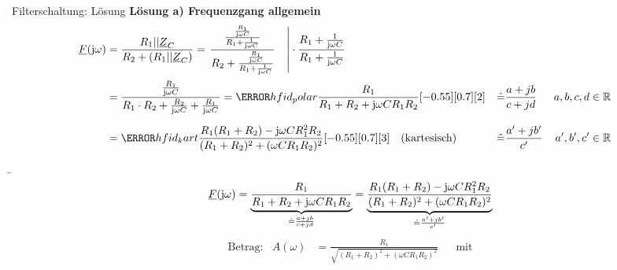 \begin{frame}[allowframebreaks]%
\begin{bsp}{Filterschaltung: Lösung}{}%
\textbf{Lösung a) Frequenzgang allgemein}
    \begin{align*}
        \underline{F}(\mathrm{j}\omega) &= \frac{R_1 || \underline{Z}_C}{R_2 + ( R_1 || \underline{Z}_C)} 
        = \left.\frac{\frac{\frac{R_1}{\mathrm{j}\omega C}}{R_1 + \frac{1}{\mathrm{j}\omega C}}}{
            R_2 + \frac{\frac{R_1}{\mathrm{j}\omega C}}{R_1 + \frac{1}{\mathrm{j}\omega C}}}\quad \right| 
            \cdot \frac{R_1 + \frac{1}{\mathrm{j}\omega C}}{R_1 + \frac{1}{\mathrm{j}\omega C}}
        \\[+2pt]
        &= \frac{\frac{R_1}{\mathrm{j}\omega C}}{R_1\cdot R_2 + \frac{R_2}{\mathrm{j}\omega C}+\frac{R_1}{\mathrm{j}\omega C}}
	    = \highlight{hfid_polar}{\frac{R_1}{R_1+R_2+\mathrm{j}\omega CR_1R_2}}[\hfofflowerb][\hfoffupperb][2]
            &&\hat{=}{} \frac{a+jb}{c+jd} 
            & a,b,c,d &\in \mathbb{R}
        \\[+6pt]
        &= \highlight{hfid_kart}{\frac{R_1(R_1+R_2)-\mathrm{j}\omega CR_1^2R_2}{(R_1+R_2)^2+(\omega CR_1R_2)^2}}[\hfofflowerb][\hfoffupperb][3]
        \quad\text{(kartesisch)}
            &&\hat{=}{} \frac{a'+jb'}{c'}
            & a',b',c' &\in \mathbb{R}
    \end{align*}\vspace{-15pt}%
\b{\framebreak}%
\b{%
\begin{equation*}
    \underline{F}(\mathrm{j}\omega) 
    = 
    \underbrace{
        \frac{R_1}{R_1+R_2+\mathrm{j}\omega CR_1R_2}
    }_{\mathrel{
        \hat{=}{} \frac{a+jb}{c+jd}
    }}%
    = 
    \underbrace{%
        \frac{R_1(R_1+R_2)-\mathrm{j}\omega CR_1^2R_2}{(R_1+R_2)^2+(\omega CR_1R_2)^2}
    }_{\mathrel{
        \hat{=}{} \frac{a'+jb'}{c'}
    }}%
\end{equation*}%
}%
    \begin{align*}
        &\text{Betrag:}&
            A(\omega) &= \frac{R_1}{\sqrt{(R_1+R_2)^2+(\omega CR_1R_2)^2}}&
            &\text{mit}&

\end{align*}
\end{bsp}
\end{frame}

